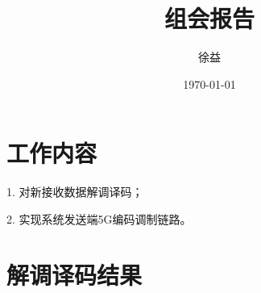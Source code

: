 \documentclass{article}
\title{组会报告}
\author{徐益}
\date{\today}
\begin{document}
\maketitle


\section{工作内容} 
1. 对新接收数据解调译码；

2. 实现系统发送端5G编码调制链路。

\section{解调译码结果}
\end{document}
